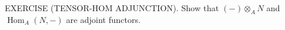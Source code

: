 EXERCISE (TENSOR-HOM ADJUNCTION). Show that $(-)\otimes_A N$ and $\operatorname{Hom}_A(N,-)$ are adjoint functors.

